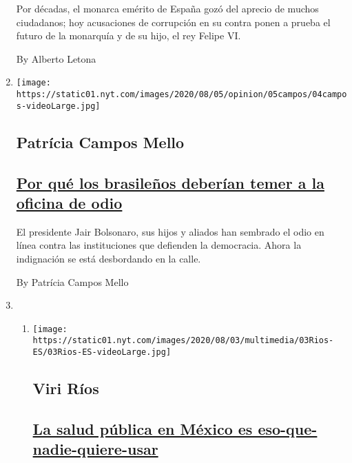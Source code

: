 \begin{enumerate}
  Por décadas, el monarca emérito de España gozó del aprecio de muchos
  ciudadanos; hoy acusaciones de corrupción en su contra ponen a prueba
  el futuro de la monarquía y de su hijo, el rey Felipe VI.

  By Alberto Letona
\item
  \texttt{[image: https://static01.nyt.com/images/2020/08/05/opinion/05campos/04campos-videoLarge.jpg]}

  \hypertarget{patruxedcia-campos-mello}{%
  \subsection{Patrícia Campos Mello}\label{patruxedcia-campos-mello}}

  \hypertarget{por-quuxe9-los-brasileuxf1os-deberuxedan-temer-a-la-oficina-de-odio}{%
  \subsection{\texorpdfstring{\href{/es/2020/08/04/espanol/opinion/bolsonaro-oficina-odio-brasil.html}{Por
  qué los brasileños deberían temer a la oficina de
  odio}}{Por qué los brasileños deberían temer a la oficina de odio}}\label{por-quuxe9-los-brasileuxf1os-deberuxedan-temer-a-la-oficina-de-odio}}

  El presidente Jair Bolsonaro, sus hijos y aliados han sembrado el odio
  en línea contra las instituciones que defienden la democracia. Ahora
  la indignación se está desbordando en la calle.

  By Patrícia Campos Mello
\item
  \begin{enumerate}
  \def\labelenumii{\arabic{enumii}.}
  \item
    \texttt{[image: https://static01.nyt.com/images/2020/08/03/multimedia/03Rios-ES/03Rios-ES-videoLarge.jpg]}

    \hypertarget{viri-ruxedos}{%
    \subsection{Viri Ríos}\label{viri-ruxedos}}

    \hypertarget{la-salud-puxfablica-en-muxe9xico-es-eso-que-nadie-quiere-usar}{%
    \subsection{\texorpdfstring{\href{/es/2020/08/03/espanol/opinion/servicio-salud-mexico.html}{La
    salud pública en México es
    eso-que-nadie-quiere-usar}}{La salud pública en México es eso-que-nadie-quiere-usar}}\label{la-salud-puxfablica-en-muxe9xico-es-eso-que-nadie-quiere-usar}}


\end{enumerate}
\end{enumerate}
